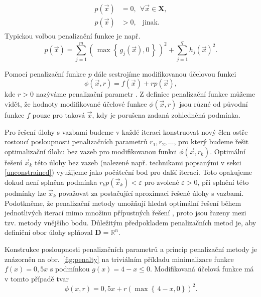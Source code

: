 \begin{align}
\begin{split}
p(\vec{x}) &=0, \ \ \forall \vec{x} \in \mathbf{X},\\[6pt]
p(\vec{x}) &>0, \ \ \text { jinak. }
\end{split}
\end{align}
Typickou volbou penalizační funkce je např.
\begin{equation}\label{eq:penalty function}
p (\vec{x}) = \sum_{j=1}^{m} \left( \, \max  \left\{ \,  g_j (\vec{x}), 0 \,  \right\} \, \right)^2 + \sum_{j=1}^{q} h_j (\vec{x})^2.
\end{equation}


Pomocí penalizační funkce $ p $ dále sestrojíme modifikovanou účelovou funkci 
\begin{equation}\label{eq:cost function with penalty}
	\phi (\vec{x}, r) = f (\vec{x}) + r p(\vec{x}),
\end{equation}
kde $ r > 0 $ nazýváme penalizační parametr \cite{Bert}. Z definice penalizační funkce můžeme vidět, že hodnoty modifikované účelové funkce $ \phi (\vec{x}, r)$ jsou různé od původní funkce $ f $ pouze pro taková $ \vec{x} $, kdy je porušena zadaná zohledněná podmínka.

Pro řešení úlohy s vazbami budeme v každé iteraci konstruovat nový člen ostře rostoucí posloupnosti penalizačních parametrů $ r_1, r_2, \dots$, pro který budeme řešit optimalizační úlohu bez vazeb pro modifikovanou funkci $ \phi (\vec{x}, r_k)$. Optimální řešení $ \vec{x}_k $ této úlohy bez vazeb (nalezené např. technikami popsanými v sekci \ref{unconstrained}) využijeme jako počáteční bod pro další iteraci. Toto opakujeme dokud není splněna podmínka $ r_k p(\vec{x}_k) < \varepsilon$ pro zvolené $  \varepsilon > 0$, při splnění této podmínky lze $ \vec{x}_k $ považovat za postačující aproximaci řešené úlohy s vazbami. Podotkněme, že penalizační metody umožňují hledat optimální řešení během jednotlivých iterací mimo množinu přípustných řešení \cite{non-linear-textbook}, proto jsou řazeny mezi tzv. metody vnějšího bodu. Důležitým předpokladem penalizačních metod je, aby definiční obor úlohy splňoval $ \mathbf{D} = \mathbb{R}^n $.

Konstrukce posloupnosti penalizačních parametrů a princip penalizační metody je znázorněn na obr.~\ref{fig:penalty} na triviálním příkladu minimalizace funkce $ f(x) = 0,5x $ s podmínkou $ g(x) = 4 - x \leq 0 $. Modifikovaná účelová funkce má v tomto případě tvar 
\begin{equation}
	 \phi (x, r) = 0,5x + r \left(\max  \left\{ \,  4-x, 0 \right\}\right)^2.
\end{equation}

